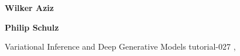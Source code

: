 \begin{bio}
{\bfseries Wilker Aziz} 

{\bfseries Philip Schulz}
\end{bio}

\begin{tutorial}
  {Variational Inference and Deep Generative Models}
  {tutorial-027}
  {\daydateyear, \tutorialmorningtime}
  {\TutLocC}

\end{tutorial}
